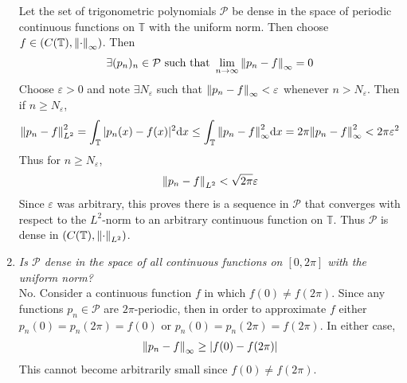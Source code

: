\documentclass[paper=a4, fontsize=11pt]{scrartcl} %
\theoremstyle{plain}
\newcommand{\E}{\varepsilon}
\numberwithin{equation}{section} %
\numberwithin{figure}{section} %
\numberwithin{table}{section} %
\begin{document}
\begin{enumerate}[\bf (a)]
        Let the set of trigonometric polynomials $\mathcal{P}$ be dense in the space of periodic continuous functions on $\mathbb{T}$ with the uniform norm.  Then choose $f \in \qty(C(\mathbb{T}), \norm{\cdot}_\infty)$.  Then
        \begin{align*}
            \exists (p_n)_n \in \mathcal{P} \text{ such that } \lim_{n\rightarrow \infty}\norm{p_n - f}_\infty = 0
        \end{align*}
        Choose $\E > 0$ and note $\exists N_\E$ such that $\norm{p_n - f}_\infty < \E$ whenever $n > N_\E$.  Then if $n \geq N_\E$,
        \begin{align*}
            \norm{p_n - f}_{L^2}^2 = \int_\mathbb{T}|p_n(x) - f(x)|^2\dd x \leq \int_\mathbb{T}\norm{p_n - f}_\infty^2\dd x = 2\pi\norm{p_n - f}_\infty^2 < 2\pi\E^2
        \end{align*}
        Thus for $n \geq N_\E$,
        \begin{align*}
            \norm{p_n - f}_{L^2} < \sqrt{2\pi}\E
        \end{align*}
        Since $\E$ was arbitrary, this proves there is a sequence in $\mathcal{P}$ that converges with respect to the $L^2$-norm to an arbitrary continuous function on $\mathbb{T}$.  Thus $\mathcal{P}$ is dense in $\qty(C(\mathbb{T}), \norm{\cdot}_{L^2})$.
    \item
        \emph{Is $\mathcal{P}$ dense in the space of all continuous functions on $[0, 2\pi]$ with the uniform norm?} \\

        No.  Consider a continuous function $f$ in which $f(0) \neq f(2\pi)$.  Since any functions $p_n \in \mathcal{P}$ are $2\pi$-periodic, then in order to approximate $f$ either $p_n(0) = p_n(2\pi) = f(0)$ or $p_n(0) = p_n(2\pi) = f(2\pi)$.  In either case,
        \begin{align*}
            \norm{p_n - f}_\infty \geq |f(0) - f(2\pi)|
        \end{align*}
        This cannot become arbitrarily small since $f(0) \neq f(2\pi)$.
\end{enumerate}
\end{document}
